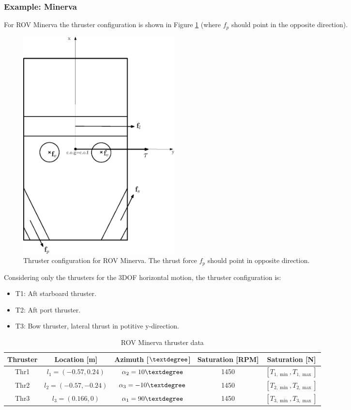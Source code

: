 \documentclass[a4paper,twoside,english]{report}
\providecommand{\tabularnewline}{\\}
\begin{document}
\subsubsection{Example: Minerva}

For ROV Minerva the thruster configuration is shown in Figure \ref{Fig_MinervaThrusters}
(where $f_{p}$ should point in the opposite direction). 
\begin{figure}[ptbh]
\centering 

\includegraphics[width=0.4\textwidth]{fig/Minerva_1}

\caption{Thruster configuration for ROV Minerva. The thrust force $f_{p}$
should point in opposite direction. }
\label{Fig_MinervaThrusters}
\end{figure}

Considering only the thrusters for the 3DOF horizontal motion, the
thruster configuration is:
\begin{itemize}
\item T1: Aft starboard thruster.
\item T2: Aft port thruster.
\item T3: Bow thruster, lateral thrust in potitive y-direction. 
\end{itemize}
\begin{table}[h!]
\centering{}%
\begin{tabular}{ccccc}
Thruster & Location {[}m{]} & Azimuth {[}$\textdegree${]} & Saturation {[}RPM{]} & Saturation {[}N{]}\tabularnewline
\hline 
Thr1 & $l_{1}=(-0.57,0.24)$ & $\alpha_{2}=10\textdegree$ & 1450 & $[T_{1,\min},T_{1,\max}]$\tabularnewline
Thr2 & $l_{2}=(-0.57,-0.24)$ & $\alpha_{3}=-10\textdegree$ & 1450 & $[T_{2,\min},T_{2,\max}]$\tabularnewline
Thr3 & $l_{3}=(0.166,0)$ & $\alpha_{1}=90\textdegree$ & 1450 & $[T_{3,\min},T_{3,\max}]$\tabularnewline
\end{tabular}\caption{ROV Minerva thruster data}
\label{tab: ROV Minerva thruster data} 
\end{table}
\end{document}
